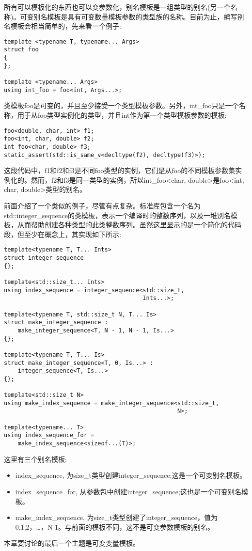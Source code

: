 所有可以模板化的东西也可以变参数化，别名模板是一组类型的别名(另一个名称)。可变别名模板是具有可变数量模板参数的类型族的名称。目前为止，编写别名模板会相当简单的，先来看一个例子:

\begin{lstlisting}[style=styleCXX]
template <typename T, typename... Args>
struct foo
{
};

template <typename... Args>
using int_foo = foo<int, Args...>;
\end{lstlisting}

类模板foo是可变的，并且至少接受一个类型模板参数。另外，int\_foo只是一个名称，用于从foo类型实例化的类型，并且int作为第一个类型模板参数的模板:

\begin{lstlisting}[style=styleCXX]
foo<double, char, int> f1;
foo<int, char, double> f2;
int_foo<char, double> f3;
static_assert(std::is_same_v<decltype(f2), decltype(f3)>);
\end{lstlisting}

这段代码中，f1和f2和f3是不同foo类型的实例，它们是从foo的不同模板参数集实例化的。然而，f2和f3是同一类型的实例，所以int\_foo<char, double>是foo<int, char, double>类型的别名。

前面介绍了一个类似的例子，尽管有点复杂。标准库包含一个名为std::integer\_sequence的类模板，表示一个编译时的整数序列，以及一堆别名模板，从而帮助创建各种类型的此类整数序列。虽然这里显示的是一个简化的代码段，但至少在概念上，其实现如下所示:

\begin{lstlisting}[style=styleCXX]
template<typename T, T... Ints>
struct integer_sequence
{};

template<std::size_t... Ints>
using index_sequence = integer_sequence<std::size_t,
								        Ints...>;

template<typename T, std::size_t N, T... Is>
struct make_integer_sequence :
	make_integer_sequence<T, N - 1, N - 1, Is...>
{};

template<typename T, T... Is>
struct make_integer_sequence<T, 0, Is...> :
	integer_sequence<T, Is...>
{};

template<std::size_t N>
using make_index_sequence = make_integer_sequence<std::size_t,
												  N>;

template<typename... T>
using index_sequence_for =
	make_index_sequence<sizeof...(T)>;
\end{lstlisting}

这里有三个别名模板:

\begin{itemize}
\item
index\_sequence, 为size\_t类型创建integer\_sequence;这是一个可变别名模板。

\item
index\_sequence\_for, 从参数包中创建integer\_sequence;这也是一个可变别名模板。

\item
make\_index\_sequence, 为size\_t类型创建了integer\_sequence，值为0,1,2，…，N-1。与前面的模板不同，这不是可变参数模板的别名。
\end{itemize}

本章要讨论的最后一个主题是可变变量模板。










